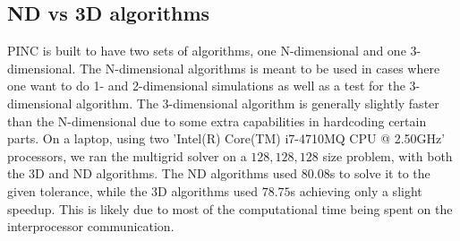 	\subsection{ND vs 3D algorithms}
		PINC is built to have two sets of algorithms, one N-dimensional and one 3-dimensional.
		The N-dimensional algorithms is meant to be used in cases where one want to do 1- and 2-dimensional
		simulations as well as a test for the 3-dimensional algorithm. The 3-dimensional algorithm
		is generally slightly faster than the N-dimensional due to some extra capabilities in hardcoding
		certain parts. On a laptop, using two 'Intel(R) Core(TM) i7-4710MQ CPU @ 2.50GHz' processors, we
		ran the multigrid solver on a \(128,128,128\) size problem, with both the \(3\)D and ND algorithms.
 		The ND algorithms used \(80.08\)s to solve it to the given tolerance, while the \(3\)D algorithms
 		used \(78.75\)s achieving only a slight speedup. This is likely due to most of the
		computational time being spent on the interprocessor communication.
